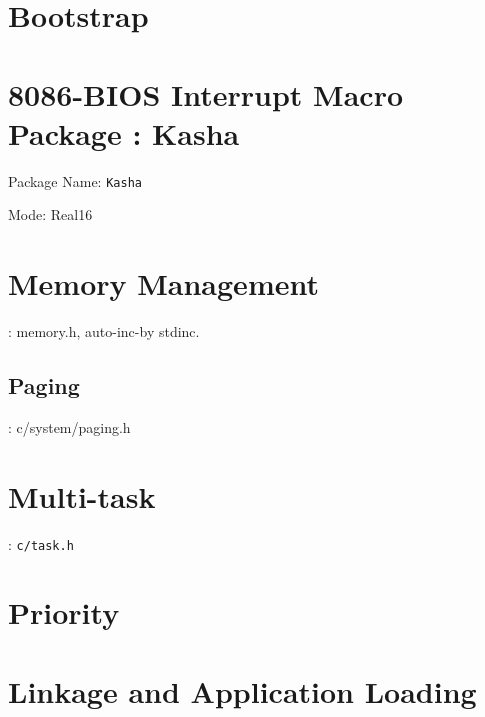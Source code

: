 

\section{Bootstrap}


\section{8086-BIOS Interrupt Macro Package : Kasha}

Package Name: \verb|Kasha| %

Mode: Real16



\section{Memory Management}
: memory.h, auto-inc-by stdinc.

\subsection{Paging}

: c/system/paging.h

\section{Multi-task}
: \verb|c/task.h|

\section{Priority}






\section{Linkage and Application Loading}


